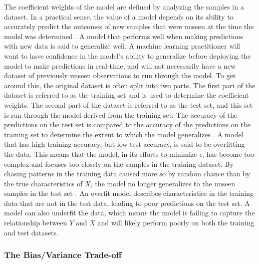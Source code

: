 \documentclass[sigconf]{acmart}
\begin{document}
The coefficient weights of the model are defined by analyzing the samples in a dataset. In a practical sense, the value of a model depends on its ability to accurately predict the outcomes of new samples that were unseen at the time the model was determined \cite{cite08}. A model that performs well when making predictions with new data is said to generalize well.
A machine learning practitioner will want to have confidence in the model's ability to generalize before deploying the model to make predictions in real-time, and will not necessarily have a new dataset of previously unseen observations to run through the model. To get around this, the original dataset is often split into two parts. The first part of the dataset is referred to as the training set and is used to determine the coefficient weights. The second part of the dataset is referred to as the test set, and this set is run through the model derived from the training set. The accuracy of the predictions on the test set is compared to the accuracy of the predictions on the training set to determine the extent to which the model generalizes \cite{cite08}.
A model that has high training accuracy, but low test accuracy, is said to be overfitting the data. This means that the model, in its efforts to minimize \(\epsilon\), has become too complex and focuses too closely on the samples in the training dataset. By chasing patterns in the training data caused more so by random chance than by the true characteristics of \(X\), the model no longer generalizes to the unseen samples in the test set \cite{cite03}\cite{cite08}. An overfit model describes characteristics in the training data that are not in the test data, leading to poor predictions on the test set.
A model can also underfit the data, which means the model is failing to capture the relationship between \(Y\) and \(X\) and will likely perform poorly on both the training and test datasets.

\subsubsection{The Bias/Variance Trade-off}
\end{document}
